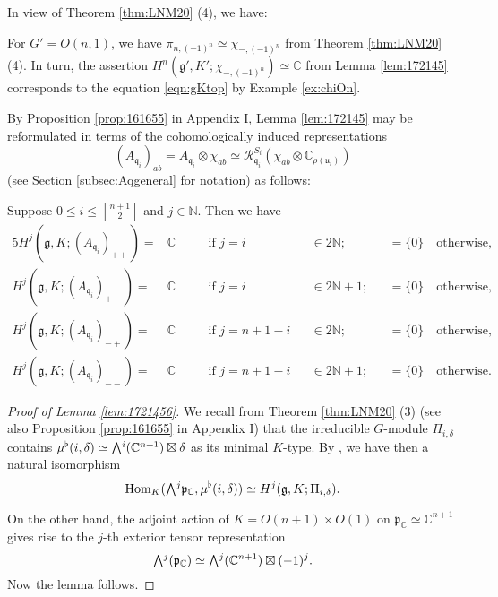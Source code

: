 In view of Theorem \ref{thm:LNM20} (4), 
 we have:
\begin{example}
\label{ex:gKchiOn}
For $G'=O(n,1)$, 
 we have $\pi_{n,(-1)^n} \simeq \chi_{-,(-1)^n}$ from 
 Theorem \ref{thm:LNM20} (4).  
In turn,
 the assertion 
$  
   H^{n}({\mathfrak{g}}', K'; \chi_{-,(-1)^n})
   \simeq
  {\mathbb{C}} 
$ from Lemma \ref{lem:172145} 
 corresponds to the equation \eqref{eqn:gKtop}
 by Example \ref{ex:chiOn}.  
\end{example}

By Proposition \ref{prop:161655} in Appendix I, 
 Lemma \ref{lem:172145} may be reformulated
 in terms of the cohomologically induced representations
\[
  (A_{{\mathfrak{q}}_i})_{a b}
  =
  A_{{\mathfrak{q}}_i} \otimes \chi_{a b}
  \simeq
  {\mathcal{R}}_{{\mathfrak{q}}_i}^{S_i} (\chi_{a b} \otimes {\mathbb{C}}_{\rho({\mathfrak{u}}_i)})
\]
 (see Section \ref{subsec:Aqgeneral} for notation)
 as follows:
\begin{lemma}
\label{lem:1721456}
Suppose $0 \le i \le [\frac{n+1}{2}]$ and $j \in {\mathbb{N}}$.  
Then we have
\begin{alignat*}{5}
H^j({\mathfrak{g}}, K;(A_{\mathfrak{q}_i})_{++})
=& {\mathbb{C}}\quad
&&\text{if $j=i$} 
&&\in 2{\mathbb{N}};
&&=\{0\}\quad
\text{otherwise,}
\\
H^j({\mathfrak{g}}, K;(A_{\mathfrak{q}_i})_{+-})
=& {\mathbb{C}}\quad
&&\text{if $j=i$}
&&\in 2{\mathbb{N}}+1;
&&=\{0\}\quad
\text{otherwise,}
\\
H^j({\mathfrak{g}}, K;(A_{\mathfrak{q}_i})_{-+})
=& {\mathbb{C}}\quad
&&\text{if $j=n+1-i$} 
&&\in 2{\mathbb{N}};
&&=\{0\}\quad
\text{otherwise,}
\\
H^j({\mathfrak{g}}, K;(A_{\mathfrak{q}_i})_{--})
=& {\mathbb{C}}\quad
&&\text{if $j=n+1-i$} 
&&\in 2{\mathbb{N}}+1;
&&=\{0\}\quad
\text{otherwise.}
\end{alignat*}
\end{lemma}


\begin{proof}
[Proof of Lemma \ref{lem:1721456}]
We recall from Theorem \ref{thm:LNM20} (3)
 (see also Proposition \ref{prop:161655} in Appendix I)
 that the irreducible $G$-module
$\Pi_{i,\delta}$
 contains $\mub(i,\delta) \simeq \Exterior^i ({\mathbb{C}}^{n+1}) \boxtimes \delta$
 as its minimal $K$-type.  
By \cite{VZ}, 
 we have then a natural isomorphism
\[
   {\operatorname{Hom}}_K
   (\Exterior^j {\mathfrak{p}}_{\mathbb{C}}, 
    \mub (i,\delta))
   \simeq
   H^j({\mathfrak{g}}, K; \Pi_{i,\delta}).  
\]


On the other hand, 
 the adjoint action of $K=O(n+1) \times O(1)$
 on ${\mathfrak{p}}_{\mathbb{C}} \simeq {\mathbb{C}}^{n+1}$
 gives rise to the $j$-th exterior tensor representation
\[
 \Exterior^j({\mathfrak{p}}_{\mathbb{C}}) 
 \simeq 
  \Exterior^j({\mathbb{C}}^{n+1}) \boxtimes (-1)^j.  
\]
Now the lemma follows.
\end{proof}


